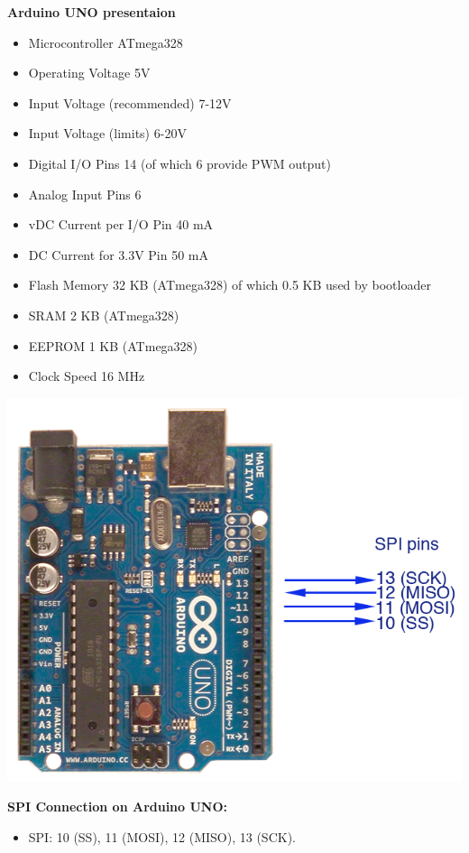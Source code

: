 \documentclass[10pt,a4paper]{report}
\begin{document}
\textbf{Arduino UNO presentaion}\\
\begin{itemize}
\item Microcontroller	ATmega328
\item Operating Voltage	5V
\item Input Voltage (recommended)	7-12V
\item Input Voltage (limits)	6-20V
\item Digital I/O Pins	14 (of which 6 provide PWM output)
\item Analog Input Pins	6
\item vDC Current per I/O Pin	40 mA
\item DC Current for 3.3V Pin	50 mA
\item Flash Memory	32 KB (ATmega328) of which 0.5 KB used by bootloader
\item SRAM	2 KB (ATmega328)
\item EEPROM	1 KB (ATmega328)
\item Clock Speed	16 MHz
\end{itemize}
\begin{center}
\includegraphics{arduinouno}\\
\end{center}

\textbf{SPI Connection on Arduino UNO:}
\begin{itemize}
\item SPI: 10 (SS), 11 (MOSI), 12 (MISO), 13 (SCK). 
\end{itemize}
\end{document}
